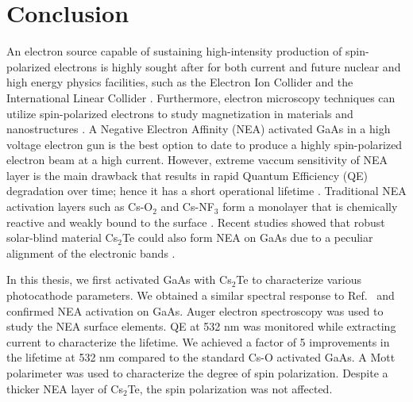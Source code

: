 \chapter{Conclusion}

An electron source capable of sustaining high-intensity production of spin-polarized electrons is highly sought after for both current and future nuclear and high energy physics facilities, such as the Electron Ion Collider and the International Linear Collider \cite{wang2022high,wang2021_DesignHighCharge, ilc2019}.
Furthermore, electron microscopy techniques can utilize spin-polarized electrons to study magnetization in materials and nanostructures \cite{suzuki2010_RealTimeMagnetic,kuwahara2012_30kVSpinpolarizedTransmission,vollmer2003}.
A Negative Electron Affinity (NEA) activated GaAs in a high voltage electron gun is the best option to date to produce a highly spin-polarized electron beam at a high current.
However, extreme vaccum sensitivity of NEA layer is the main drawback that results in rapid Quantum Efficiency (QE) degradation over time; hence it has a short operational lifetime \cite{grames2011_ChargeFluenceLifetime, bae2018_RuggedSpinpolarizedElectron,bae2020_ImprovedLifetimeHigh,cultrera2020_LongLifetimePolarized}.
Traditional NEA activation layers such as Cs-O$_2$ and Cs-NF$_3$ form a monolayer that is chemically reactive and weakly bound to the surface \cite{kuriki2011_DarklifetimeDegradationGaAs,chanlek2014_DegradationQuantumEfficiency}.
Recent studies showed that robust solar-blind material Cs$_2$Te could also form NEA on GaAs due to a peculiar alignment of the electronic bands \cite{kuriki2015_GaAsPhotocathodeActivation,sugiyama2011_StudyElectronAffinity,uchida2014_STUDYROBUSTNESSNEAGAAS}.

In this thesis, we first activated GaAs with Cs$_2$Te to characterize various photocathode parameters. We obtained a similar spectral response to Ref.~\cite{kuriki2015_GaAsPhotocathodeActivation} and confirmed NEA activation on GaAs.
Auger electron spectroscopy was used to study the NEA surface elements.
QE at 532 nm was monitored while extracting current to characterize the lifetime. We achieved a factor of 5 improvements in the lifetime at 532 nm compared to the standard Cs-O activated GaAs.
A Mott polarimeter was used to characterize the degree of spin polarization. Despite a thicker NEA layer of Cs$_2$Te, the spin polarization was not affected.

